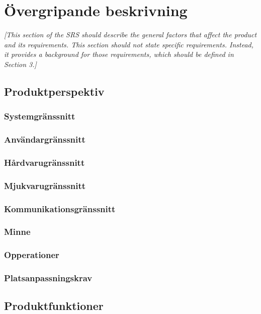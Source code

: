 \documentclass{article}
\begin{document}

\section{Övergripande beskrivning}
\label{sec:overall}

\emph{[This section of the SRS should describe the general factors that
  affect the product and its requirements. This section should not state
  specific requirements. Instead, it provides a background for those
  requirements, which should be defined in Section 3.]}

\subsection{Produktperspektiv}

\subsubsection{Systemgränssnitt}
\subsubsection{Användargränssnitt}
\subsubsection{Hårdvarugränssnitt}
\subsubsection{Mjukvarugränssnitt}
\subsubsection{Kommunikationsgränssnitt}
\subsubsection{Minne}
\subsubsection{Opperationer}
\subsubsection{Platsanpassningskrav}

\subsection{Produktfunktioner}
\end{document}
